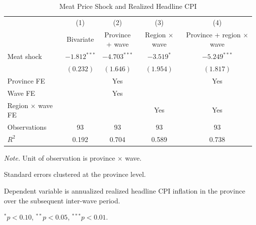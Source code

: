 \begin{table}[!htbp]
\centering
\caption{Meat Price Shock and Realized Headline CPI}
\label{tab:eq2_cpi_passthrough}
\begin{threeparttable}
\begin{tabular}{lcccc}
\toprule
& (1) & (2) & (3) & (4) \\
& Bivariate & \shortstack{Province\\+ wave} & \shortstack{Region\\$\times$ wave} & \shortstack{Province +\\region $\times$ wave} \\
\midrule
Meat shock & $-1.812^{***}$ & $-4.703^{***}$ & $-3.519^{*}$ & $-5.249^{***}$ \\
& $(0.232)$ & $(1.646)$ & $(1.954)$ & $(1.817)$ \\[6pt]
Province FE &  & Yes &  & Yes \\
Wave FE &  & Yes &  &  \\
Region $\times$ wave FE &  &  & Yes & Yes \\
\midrule
Observations & 93 & 93 & 93 & 93 \\
$R^2$ & 0.192 & 0.704 & 0.589 & 0.738 \\
\bottomrule
\end{tabular}
\begin{tablenotes}[flushleft]
\footnotesize
\item \textit{Note.} Unit of observation is province $\times$ wave.
\item Standard errors clustered at the province level.
\item Dependent variable is annualized realized headline CPI inflation in the province over the subsequent inter-wave period.
\item $^{*}p<0.10$, $^{**}p<0.05$, $^{***}p<0.01$.
\end{tablenotes}
\end{threeparttable}
\end{table}
